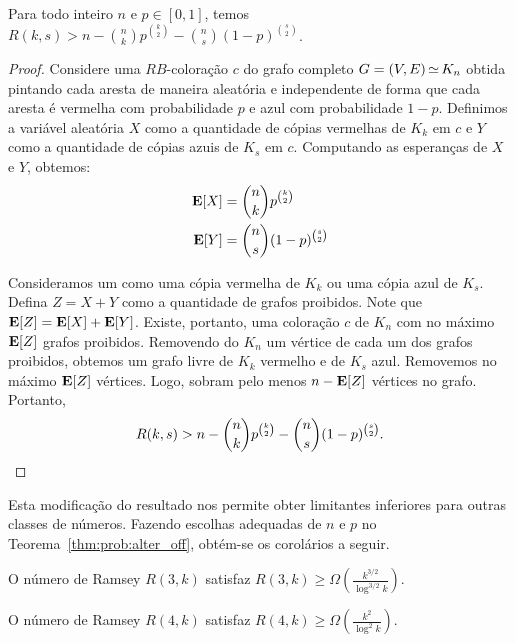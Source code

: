 \begin{theorem}
\label{thm:prob:alter_off}
Para todo inteiro $n$ e $p \in [0,1]$, temos $\displaystyle R(k, s) > n - \binom{n}{k}p^{\binom{k}{2}} - \binom{n}{s}(1-p)^{\binom{s}{2}}$.
\end{theorem}
\begin{proof}
Considere uma $RB$-coloração $c$ do grafo completo $G = (V,E) \operatorname{\simeq} K_n$ obtida pintando cada aresta de maneira aleatória e independente de forma que cada aresta é vermelha com probabilidade $p$ e azul com probabilidade $1-p$.
Definimos a variável aleatória $X$ como a quantidade de cópias vermelhas de $K_k$ em $c$ e $Y$ como a quantidade de cópias azuis de $K_s$ em $c$. Computando as esperanças de $X$ e $Y$, obtemos:
\begin{align*}
\operatorname{\mathbf{E}}[X] &= \binom{n}{k}p^{\binom{k}{2}} \\
\operatorname{\mathbf{E}}[Y] &= \binom{n}{s}(1-p)^{\binom{s}{2}}
\end{align*}

Consideramos um  como uma cópia vermelha de $K_k$ ou uma cópia azul de $K_s$. Defina $Z = X + Y$ como a quantidade de grafos proibidos. Note que $\operatorname{\mathbf{E}}[Z] = \operatorname{\mathbf{E}}[X] + \operatorname{\mathbf{E}}[Y]$. Existe, portanto, uma coloração $c$ de $K_n$ com no máximo $\operatorname{\mathbf{E}}[Z]$ grafos proibidos. Removendo do $K_n$ um vértice de cada um dos grafos proibidos, obtemos um grafo livre de $K_k$ vermelho e de $K_s$ azul. Removemos no máximo $\operatorname{\mathbf{E}}[Z]$ vértices. Logo, sobram pelo menos $n - \operatorname{\mathbf{E}}[Z] $ vértices no grafo. Portanto,
\[ R(k, s) > n - \binom{n}{k}p^{\binom{k}{2}} - \binom{n}{s}(1-p)^{\binom{s}{2}}.  \qedhere\]
\end{proof}

Esta modificação do resultado nos permite obter limitantes inferiores para outras classes de números. Fazendo escolhas adequadas de $n$ e $p$ no Teorema~\ref{thm:prob:alter_off}, obtém-se os corolários a seguir.

\begin{noproofcorollary}
O número de Ramsey $R(3,k)$ satisfaz $\displaystyle R(3,k) \geq  \Omega\left( \frac{k^{3/2}}{\log^{3/2} k}\right)$.
\end{noproofcorollary}

\begin{noproofcorollary}
O número de Ramsey $R(4,k)$ satisfaz $\displaystyle R(4,k) \geq  \Omega\left( \frac{k^2}{\log^2 k}\right)$.
\end{noproofcorollary}

